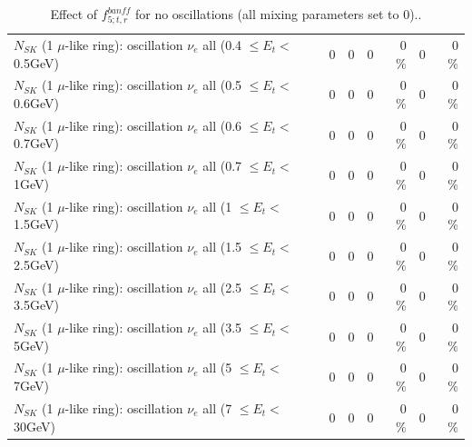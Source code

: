 \begin{table}
\begin{tabular}{| l | r | r | r  r | r  r |}
$N_{SK}$ (1 $\mu$-like ring): oscillation $\nu_{e}$ all (0.4 $\leq E_{t} <$ 0.5GeV) &               0 &               0 &               0 &        0 \%  &               0 &        0 \%  \\ 
$N_{SK}$ (1 $\mu$-like ring): oscillation $\nu_{e}$ all (0.5 $\leq E_{t} <$ 0.6GeV) &               0 &               0 &               0 &        0 \%  &               0 &        0 \%  \\ 
$N_{SK}$ (1 $\mu$-like ring): oscillation $\nu_{e}$ all (0.6 $\leq E_{t} <$ 0.7GeV) &               0 &               0 &               0 &        0 \%  &               0 &        0 \%  \\ 
$N_{SK}$ (1 $\mu$-like ring): oscillation $\nu_{e}$ all (0.7 $\leq E_{t} <$ 1GeV) &               0 &               0 &               0 &        0 \%  &               0 &        0 \%  \\ 
$N_{SK}$ (1 $\mu$-like ring): oscillation $\nu_{e}$ all (1 $\leq E_{t} <$ 1.5GeV) &               0 &               0 &               0 &        0 \%  &               0 &        0 \%  \\ 
$N_{SK}$ (1 $\mu$-like ring): oscillation $\nu_{e}$ all (1.5 $\leq E_{t} <$ 2.5GeV) &               0 &               0 &               0 &        0 \%  &               0 &        0 \%  \\ 
$N_{SK}$ (1 $\mu$-like ring): oscillation $\nu_{e}$ all (2.5 $\leq E_{t} <$ 3.5GeV) &               0 &               0 &               0 &        0 \%  &               0 &        0 \%  \\ 
$N_{SK}$ (1 $\mu$-like ring): oscillation $\nu_{e}$ all (3.5 $\leq E_{t} <$ 5GeV) &               0 &               0 &               0 &        0 \%  &               0 &        0 \%  \\ 
 $N_{SK}$ (1 $\mu$-like ring): oscillation $\nu_{e}$ all (5 $\leq E_{t} <$ 7GeV) &               0 &               0 &               0 &        0 \%  &               0 &        0 \%  \\ 
$N_{SK}$ (1 $\mu$-like ring): oscillation $\nu_{e}$ all (7 $\leq E_{t} <$ 30GeV) &               0 &               0 &               0 &        0 \%  &               0 &        0 \%  \\ 
\hline
\hline
\end{tabular}
\caption{ Effect of $f_{5; t, r}^{banff}$ for no oscillations (all mixing parameters set to 0).. }
\label{tab:num_banff_05_1RmuT_3f_osc_t13:0}
\end{table}
\clearpage
